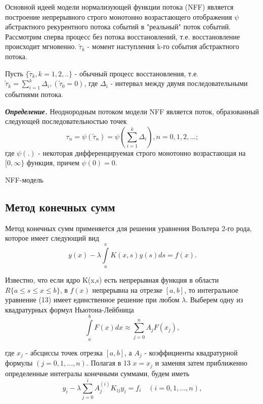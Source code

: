 Основной идеей модели нормализующей функции потока (NFF) является построение непрерывного строго монотонно возрастающего отображения $\psi$ абстрактного рекурентного потока событий в "реальный" поток событий. Рассмотрим сперва процесс без потока восстановлений, т.е. восстановление происходит мгновенно. $\widetilde{\tau}_k$ - момент наступления k-го события абстрактного потока. 

Пусть $\{\widetilde{\tau}_k, k =1,2,..\}$ - обычный процесс восстановления, т.е. $\widetilde{\tau}_k = \sum_{i=1}^k \Delta_i, (\widetilde{\tau}_0 = 0)$, где $\Delta_i$ - интервал между двумя последовательными событиями  потока.

{\bfseries \textit{Определение.}} Неоднородным потоком модели NFF является поток, образованный следующей последовательностью точек
 \begin{equation}
\tau_n = \psi(\widetilde{\tau}_n) = \psi(\sum_{i=1}^k \Delta_i), n = 0, 1, 2, ...;
\end{equation}
где $\psi(.)$  - некоторая дифференцируемая строго монотонно возрастающая  на $[0, \infty\}$  функция, причем $\psi(0) = 0$.

NFF-модель \Upsilon
\begin{center}
\item\subsection{Метод конечных сумм}
\end{center}
Метод конечных сумм применяется для решения уравнения Вольтера 2-го рода, которое имеет следующий вид
\begin{equation}
y(x) - \lambda \int\limits_a^x K(x, s) y(s) ds = f(x).
\end{equation}

Известно, что если ядро K(x,s) есть непрерывная функция в области $R\{a \leqslant s \leqslant x \leqslant b\}$, в $f(x)$ непрерывна на отрезке $[a,b]$, то интегральное  уравнение (13) имеет единственное решение при любом $\lambda$. Выберем одну из квадратурных формул Ньютона-Лейбница
\begin{equation}
\int\limits_a^b F(x) dx \approx \sum\limits_{j=0}^n A_j F(x_j),
\end{equation}

где $x_j$ - абсциссы точек отрезка $[a, b]$, а $A_j$ - коэффициенты квадратурной формулы $(j = 0, 1, ..., n)$. Полагая в 13 $x = x_j$ и заменяя затем приближенно определенные интегралы конечными суммами, будем иметь
\begin{equation}
y_i - \lambda \sum\limits_{j=0}^i A_j^{(i)} K_{ij} y_i = f_i \quad (i = 0, 1, ..., n),
\end{equation}

